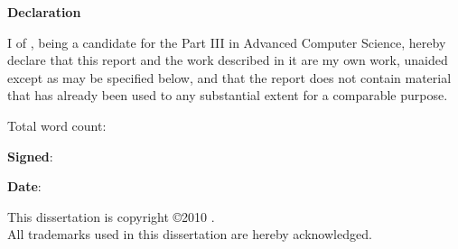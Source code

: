 \newpage
{\Huge \bf Declaration}

\vspace{24pt} 

I \authorname of \authorcollege, being a candidate for the Part III in
Advanced Computer Science, hereby declare that this report and the
work described in it are my own work, unaided except as may be
specified below, and that the report does not contain material that
has already been used to any substantial extent for a comparable
purpose.

\vspace{24pt}
Total word count: \wordcount

\vspace{60pt}
\textbf{Signed}: 

\vspace{12pt}
\textbf{Date}:


\vfill

This dissertation is copyright \copyright 2010 \authorname. 
\\
All trademarks used in this dissertation are hereby acknowledged.



\newpage
\vspace*{\fill}
